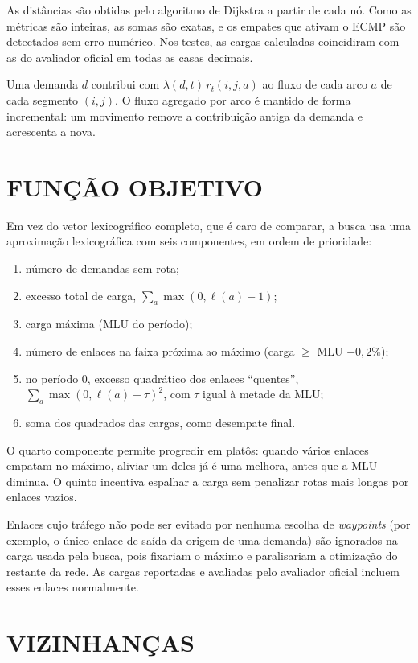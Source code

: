 As distâncias são obtidas pelo algoritmo de Dijkstra a partir de cada nó. Como as métricas são inteiras, as somas são exatas, e os empates que ativam o ECMP são detectados sem erro numérico. Nos testes, as cargas calculadas coincidiram com as do avaliador oficial em todas as casas decimais.

Uma demanda $d$ contribui com $\lambda(d, t)\, r_t(i, j, a)$ ao fluxo de cada arco $a$ de cada segmento $(i, j)$. O fluxo agregado por arco é mantido de forma incremental: um movimento remove a contribuição antiga da demanda e acrescenta a nova.

\section{\uppercase{Função Objetivo}}

Em vez do vetor lexicográfico completo, que é caro de comparar, a busca usa uma aproximação lexicográfica com seis componentes, em ordem de prioridade:
\begin{enumerate}
    \item número de demandas sem rota;
    \item excesso total de carga, $\sum_a \max(0, \ell(a) - 1)$;
    \item carga máxima (MLU do período);
    \item número de enlaces na faixa próxima ao máximo (carga $\geq$ MLU $- 0{,}2\%$);
    \item no período 0, excesso quadrático dos enlaces ``quentes'', $\sum_a \max(0, \ell(a) - \tau)^2$, com $\tau$ igual à metade da MLU;
    \item soma dos quadrados das cargas, como desempate final.
\end{enumerate}
O quarto componente permite progredir em platôs: quando vários enlaces empatam no máximo, aliviar um deles já é uma melhora, antes que a MLU diminua. O quinto incentiva espalhar a carga sem penalizar rotas mais longas por enlaces vazios.

Enlaces cujo tráfego não pode ser evitado por nenhuma escolha de \textit{waypoints} (por exemplo, o único enlace de saída da origem de uma demanda) são ignorados na carga usada pela busca, pois fixariam o máximo e paralisariam a otimização do restante da rede. As cargas reportadas e avaliadas pelo avaliador oficial incluem esses enlaces normalmente.

\section{\uppercase{Vizinhanças}}

